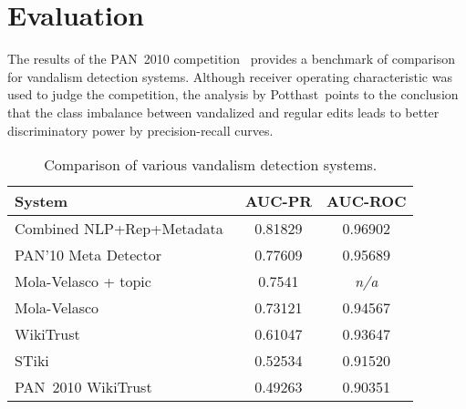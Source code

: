 \section{Evaluation}

The results of the PAN~2010 competition~\cite{Potthast2010b}
provides a benchmark of comparison for vandalism detection systems.
Although receiver operating characteristic was used to judge the
competition, the analysis by Potthast~\etal points to the conclusion
that the class imbalance between vandalized and regular edits
leads to better discriminatory power by precision-recall curves.


\begin{table}[tbhp]
    \begin{center}
        \begin{tabular}{|l|c|c|}
\hline
\textbf{System} & \textbf{AUC-PR} & \textbf{AUC-ROC} \\
\hline
\hline
Combined NLP+Rep+Metadata~\cite{Adler2011} & 0.81829 & 0.96902 \\
PAN'10 Meta Detector~\cite{Potthast2010b} & 0.77609 & 0.95689 \\
Mola-Velasco + topic~\cite{Mola2011} & 0.7541 & \textit{n/a} \\
Mola-Velasco~\cite{Adler2011} & 0.73121 & 0.94567 \\
WikiTrust~\cite{Adler2011} & 0.61047 & 0.93647 \\
STiki~\cite{Adler2011} & 0.52534 & 0.91520 \\
PAN~2010 WikiTrust~\cite{Potthast2010b} & 0.49263 & 0.90351 \\
\hline
        \end{tabular}
    \end{center}
    \caption{Comparison of various vandalism detection systems.}
\end{table}
